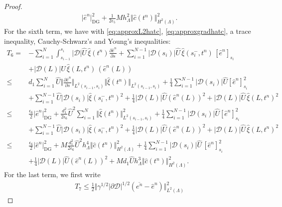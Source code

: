 \documentclass[pdflatex,sn-mathphys-num]{sn-jnl}%
\newcommand{\DG}{\mathrm{DG}}
\theoremstyle{thmstyleone}%
\theoremstyle{thmstyletwo}%
\theoremstyle{thmstylethree}%
\begin{document}
\begin{proof}
\begin{align*}
\vert \hat e^n \vert_{\DG}^2
+ \frac{1}{2 \epsilon_5} M h_\Lambda^2 \Vert \hat c(t^n) \Vert_{H^2(\Lambda)}^2.
\end{align*}
For the sixth term, we have with \eqref{eq:approxL2hatc}, \eqref{eq:approxgradhatc},
a trace inequality, Cauchy-Schwarz's and Young's inequalities:
\begin{align*}
T_6 %
= & -\sum_{i=1}^{N} \int_{s_{i-1}}^{s_i}|\mathcal{D}|\hat U \, \hat \xi (t^n)\frac{\partial\hat e^n}{\partial s} 
+\sum_{i=1}^{  N-1 }
    \vert \mathcal{D}(s_i)\vert  \hat U \, \hat \xi(s_i^-,t^n) \, [\hat e^n]_{s_i}\\
    & +|\mathcal{D}(L)| \hat U \, \hat \xi(L, t^n)\, (\hat e^n(L))\\
\leq & 
d_1 \sum_{i=1}^{N} \hat U \Vert \frac{\partial\hat e^n}{\partial s} \Vert_{L^2(s_{i-1},s_i)} \Vert \hat \xi(t^n)\Vert_{L^2(s_{i-1},s_i)}
+ \frac14 \sum_{i=1}^{N-1}  \vert \mathcal{D}(s_i)\vert \hat U [\hat e^n]_{s_i}^2
\nonumber\\
& + \sum_{i=1}^{N-1}  \hat U \vert \mathcal{D}(s_i)\vert \hat \xi(s_i^-,t^n)^2
+\frac14 |\mathcal{D}(L)| \hat U (\hat e^n(L))^2
+ |\mathcal{D}(L)| \hat U \, \hat \xi(L, t^n)^2\\
\leq & \frac{\epsilon_6}{2} \vert \hat e^n \vert_{\DG}^2 
+ \frac{d_1^2}{2\epsilon_6} \hat U^2
\sum_{i=1}^{N} \Vert \hat \xi(t^n)\Vert_{L^2(s_{i-1},s_i)}^2
+ \frac14 \sum_{i=1}^{N-1} \vert \mathcal{D}(s_i)\vert   \hat U [\hat e^n]_{s_i}^2
\nonumber\\
& + \sum_{i=1}^{N-1}  \hat U \vert \mathcal{D}(s_i)\vert \hat \xi(s_i^-,t^n)^2
+\frac14 |\mathcal{D}(L)| \hat U (\hat e^n(L))^2
+ |\mathcal{D}(L)| \hat U \, \hat \xi(L, t^n)^2\\
\leq & \frac{\epsilon_6}{2} \vert \hat e^n \vert_{\DG}^2 
+ M \frac{d_1^2}{2\epsilon_6} \hat U^2
h_{\Lambda}^4 \Vert \hat c(t^n)\Vert_{H^2(\Lambda)}^2
+ \frac14 \sum_{i=1}^{N-1}  \vert \mathcal{D}(s_i)\vert \hat U \, [\hat e^n]_{s_i}^2
\nonumber\\
& +\frac14 |\mathcal{D}(L)| \hat U (\hat e^n(L))^2
+ M d_1  \hat U h_\Lambda^{3} \Vert \hat c(t^n)\Vert_{H^2(\Lambda)}^2.
\end{align*}
For the last term, we first write
\begin{align*}
T_7 %
  \leq
 \frac{1}{2}
 \Vert \gamma^{1/2} \vert \partial\mathcal{D}\vert^{1/2} (\overline{e^{n}}-\hat{e}^{n}) \Vert_{L^2(\Lambda)}^2

\end{align*}
\end{proof}
\end{document}
